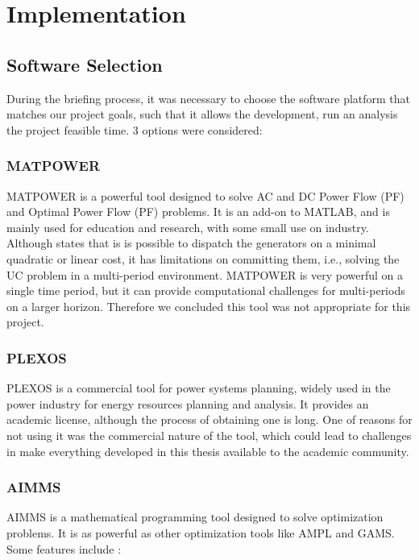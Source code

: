 \documentclass[12pt,LUDisStyle,twosided]{book}
\begin{document}
\section{Implementation}


\subsection{Software Selection}

During the briefing process, it was necessary to choose the software platform that matches our project goals, such that it allows the development, run an analysis the project feasible time. 3 options were considered:

\subsubsection{MATPOWER}

MATPOWER is a powerful tool designed to solve AC and DC Power Flow (PF) and Optimal Power Flow (PF) problems. It is an add-on to MATLAB, and is mainly used for education and research, with some small use on industry. \cite{zimmerman} Although \citeauthor{zimmerman} states that is is possible to dispatch the generators on a minimal quadratic or linear cost, it has limitations on committing them, i.e., solving the UC problem in a multi-period environment. MATPOWER is very powerful on a single time period, but it can provide computational challenges for multi-periods on a larger horizon. Therefore we concluded this tool was not appropriate for this project.

\subsubsection{PLEXOS \textregistered }

PLEXOS \textregistered is a commercial tool for power systems planning, widely used in the power industry for energy resources planning and analysis. It provides an academic license, although the process of obtaining one is long. One of reasons for not using it was the commercial nature of the tool, which could lead to challenges in make everything developed in this thesis available to the academic community.  

\subsubsection{AIMMS}


AIMMS is a mathematical programming tool designed to solve optimization problems. It is as powerful as other optimization tools like AMPL and GAMS. Some features include \cite{bisschop}:
\end{document}
